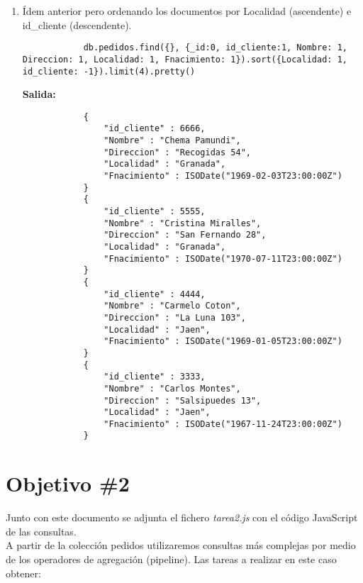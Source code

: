 \begin{enumerate}
	\item Ídem anterior pero ordenando los documentos por Localidad (ascendente) e id\_cliente (descendente).
		\begin{lstlisting}
			db.pedidos.find({}, {_id:0, id_cliente:1, Nombre: 1, Direccion: 1, Localidad: 1, Fnacimiento: 1}).sort({Localidad: 1, id_cliente: -1}).limit(4).pretty()
		\end{lstlisting}
		\textbf{Salida:}
		\begin{lstlisting}
			{
				"id_cliente" : 6666,
				"Nombre" : "Chema Pamundi",
				"Direccion" : "Recogidas 54",
				"Localidad" : "Granada",
				"Fnacimiento" : ISODate("1969-02-03T23:00:00Z")
			}
			{
				"id_cliente" : 5555,
				"Nombre" : "Cristina Miralles",
				"Direccion" : "San Fernando 28",
				"Localidad" : "Granada",
				"Fnacimiento" : ISODate("1970-07-11T23:00:00Z")
			}
			{
				"id_cliente" : 4444,
				"Nombre" : "Carmelo Coton",
				"Direccion" : "La Luna 103",
				"Localidad" : "Jaen",
				"Fnacimiento" : ISODate("1969-01-05T23:00:00Z")
			}
			{
				"id_cliente" : 3333,
				"Nombre" : "Carlos Montes",
				"Direccion" : "Salsipuedes 13",
				"Localidad" : "Jaen",
				"Fnacimiento" : ISODate("1967-11-24T23:00:00Z")
			}
		\end{lstlisting}
\end{enumerate}

\section{Objetivo \#2}

Junto con este documento se adjunta el fichero \textit{tarea2.js} con el código JavaScript de las consultas. \\

A partir de la colección pedidos utilizaremos consultas más complejas por medio de los operadores de agregación (pipeline). Las tareas a realizar en este caso obtener: \\


